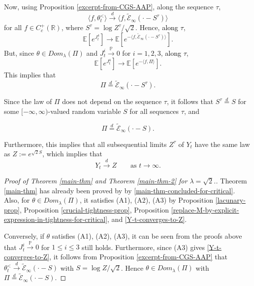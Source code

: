 \documentclass[a4paper,reqno]{amsart}%
\newcommand{\1}{\mathbf 1}
\theoremstyle{mine}
\numberwithin{theorem}{section}
\numberwithin{equation}{section}
\theoremstyle{remark}
\begin{document}
Now, using Proposition \ref{excerpt-from-CGS-AAP}, along the sequence $\tau$, 
\begin{equation}\label{reuse-of-main-result-CGS-along-subsequence}
     \langle f, \theta_{t}^{<} \rangle \overset{d}{\to} \langle f, \widetilde{\mathcal{E}}_\infty(\cdot - S^\tau)\rangle
\end{equation}
for all $f \in C_c^+(\mathbb{R})$, where $S^\tau= \log Z^\tau/\sqrt{2}$. Hence, \textcolor{black}{along $\tau$},
\[ \mathbb{E}[e^{J_t^4}] \to \mathbb{E}[e^{-\langle f, \widetilde{\mathcal{E}}_\infty(\cdot - S^\tau)\rangle}].\]
But, since $\theta \in Dom_{\lambda}(\Pi)$ and $J_t^i\overset{\mathbb{P}}{\to} 0$ for $i=1,2,3$, \textcolor{black}{along $\tau$},
\[ \mathbb{E}[e^{J_t^4}] \to \mathbb{E}[e^{-\langle f, \Pi\rangle}].\]
This implies that 
\begin{equation}
    \Pi \overset{d}{=} \widetilde{\mathcal E}_\infty(\cdot -S^\tau).
\end{equation}

Since the law of $\Pi$ does not depend on the sequence $\tau$, it follows that $S^{\tau} \overset{d}{=} S$ for some $[-\infty, \infty)$-valued random variable $S$ for all sequences $\tau$, and

\begin{equation}\label{main-thm-concluded-for-critical}
    \Pi \overset{d}{=} \widetilde{\mathcal E}_\infty(\cdot -S).
\end{equation}

Furthermore, this implies that all subsequential limits $Z^\tau$ of $Y_t$ have the same law as $Z:= e^{\sqrt{2} S}$, which implies that 
\begin{equation}\label{Y-t-converges-to-Z}
    Y_t \overset{d}{\to} Z \qquad \text{as $t \to \infty$.}
\end{equation}



\begin{proof}[Proof of Theorem \ref{main-thm} and Theorem \ref{main-thm-2} for $\lambda =\sqrt{2}$.]

    Theorem \ref{main-thm} has already been proved by by \eqref{main-thm-concluded-for-critical}. Also, for $\theta \in Dom_{\lambda}(\Pi)$, it satisfies (A1), (A2), (A3) by Proposition \ref{lacunary-prop}, Proposition \ref{crucial-tightness-prop}, Proposition \ref{replace-M-by-explicit-expression-in-tightness-for-critical}, and \eqref{Y-t-converges-to-Z}. 
    
    Conversely, if $\theta$ satisfies (A1), (A2), (A3), it can be seen from the proofs above that $J_t^i \overset{\mathbb{P}}{\to} 0$ for $1\leq i\leq 3$ still holds. Furthermore, since (A3) gives \eqref{Y-t-converges-to-Z}, it follows from Proposition \ref{excerpt-from-CGS-AAP} that $\theta_{t}^{<} \overset{d}{\to} \widetilde{\mathcal E}_\infty(\cdot -S)$ with $S= \log Z /\sqrt{2}$. Hence $\theta \in Dom_{\lambda}(\Pi)$ with $\Pi \overset{d}{=} \widetilde{\mathcal E}_\infty(\cdot -S)$.
\end{proof}
\end{document}
